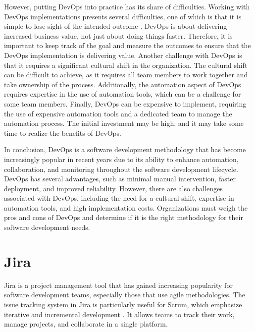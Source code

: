 However, putting DevOps into practice has its share of difficulties. Working with DevOps implementations presents several difficulties, one of which is that it is simple to lose sight of the intended outcome \cite{joakim}. DevOps is about delivering increased business value, not just about doing things faster. Therefore, it is important to keep track of the goal and measure the outcomes to ensure that the DevOps implementation is delivering value. Another challenge with DevOps is that it requires a significant cultural shift in the organization. The cultural shift can be difficult to achieve, as it requires all team members to work together and take ownership of the process. Additionally, the automation aspect of DevOps requires expertise in the use of automation tools, which can be a challenge for some team members. Finally, DevOps can be expensive to implement, requiring the use of expensive automation tools and a dedicated team to manage the automation process. The initial investment may be high, and it may take some time to realize the benefits of DevOps.

In conclusion, DevOps is a software development methodology that has become increasingly popular in recent years due to its ability to enhance automation, collaboration, and monitoring throughout the software development lifecycle. DevOps has several advantages, such as minimal manual intervention, faster deployment, and improved reliability. However, there are also challenges associated with DevOps, including the need for a cultural shift, expertise in automation tools, and high implementation costs. Organizations must weigh the pros and cons of DevOps and determine if it is the right methodology for their software development needs.

\section{Jira}
Jira is a project management tool that has gained increasing popularity for software development teams, especially those that use agile methodologies. The issue tracking system in Jira is particularly useful for Scrum, which emphasize iterative and incremental development \cite{patrick2, ravis, davidh}. It allows teams to track their work, manage projects, and collaborate in a single platform. 

